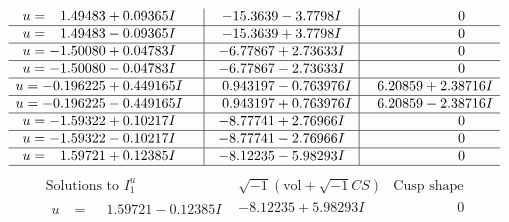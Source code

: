 \documentclass[1p]{elsarticle_modified}
\theoremstyle{definition}
\newcommand{\I}{\sqrt{-1}}
\begin{document}
$$\begin{array}{c|c|c}
\begin{aligned}
u &= \phantom{-}1.49483 + 0.09365 I\end{aligned}
 & -15.3639 - 3.7798 I & \phantom{-0.000000 } 0 \\ \hline\begin{aligned}
u &= \phantom{-}1.49483 - 0.09365 I\end{aligned}
 & -15.3639 + 3.7798 I & \phantom{-0.000000 } 0 \\ \hline\begin{aligned}
u &= -1.50080 + 0.04783 I\end{aligned}
 & -6.77867 + 2.73633 I & \phantom{-0.000000 } 0 \\ \hline\begin{aligned}
u &= -1.50080 - 0.04783 I\end{aligned}
 & -6.77867 - 2.73633 I & \phantom{-0.000000 } 0 \\ \hline\begin{aligned}
u &= -0.196225 + 0.449165 I\end{aligned}
 & \phantom{-}0.943197 - 0.763976 I & \phantom{-}6.20859 + 2.38716 I \\ \hline\begin{aligned}
u &= -0.196225 - 0.449165 I\end{aligned}
 & \phantom{-}0.943197 + 0.763976 I & \phantom{-}6.20859 - 2.38716 I \\ \hline\begin{aligned}
u &= -1.59322 + 0.10217 I\end{aligned}
 & -8.77741 + 2.76966 I & \phantom{-0.000000 } 0 \\ \hline\begin{aligned}
u &= -1.59322 - 0.10217 I\end{aligned}
 & -8.77741 - 2.76966 I & \phantom{-0.000000 } 0 \\ \hline\begin{aligned}
u &= \phantom{-}1.59721 + 0.12385 I\end{aligned}
 & -8.12235 - 5.98293 I & \phantom{-0.000000 } 0\\
 \hline 
 \end{array}$$\newpage$$\begin{array}{c|c|c}  
\text{Solutions to }I^u_{1}& \I (\text{vol} + \sqrt{-1}CS) & \text{Cusp shape}\\
 \hline 
\begin{aligned}
u &= \phantom{-}1.59721 - 0.12385 I\end{aligned}
 & -8.12235 + 5.98293 I & \phantom{-0.000000 } 0 \\ \hline\begin{aligned}

\end{aligned}
\end{array}$$
\end{document}
